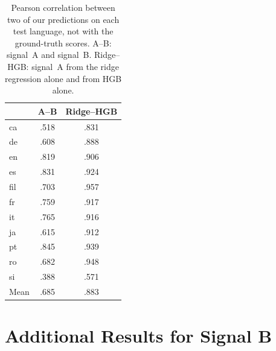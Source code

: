 \documentclass[11pt]{article}
\begin{document}
\begin{table}[hb]
\centering
\small
\setlength{\tabcolsep}{4pt}
\begin{tabular}{lcc}
\toprule
 & A--B & Ridge--HGB \\
\midrule
ca   & .518 & .831 \\ %
de   & .608 & .888 \\ %
en   & .819 & .906 \\ %
es   & .831 & .924 \\ %
fil  & .703 & .957 \\ %
fr   & .759 & .917 \\ %
it   & .765 & .916 \\ %
ja   & .615 & .912 \\ %
pt   & .845 & .939 \\ %
ro   & .682 & .948 \\ %
si   & .388 & .571 \\ %
\midrule
Mean & .685 & .883 \\ %
\bottomrule
\end{tabular}
\caption{Pearson correlation between two of our predictions on each test language, not with the
ground-truth scores. A--B: signal~A and signal~B. Ridge--HGB: signal~A from the ridge regression
alone and from HGB alone.}
\label{tab:corr-ab}
\end{table}

\section{Additional Results for Signal B}
\label{sec:appendix-signal-b}
\end{document}

